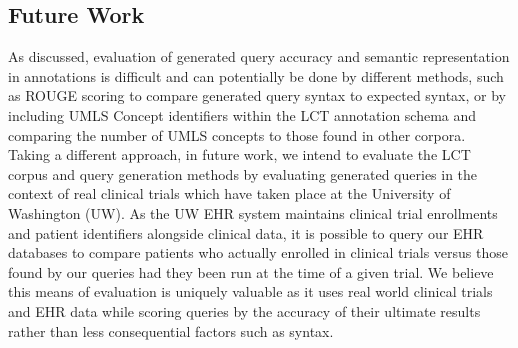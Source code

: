 \documentclass[../main.tex]{subfiles}
\begin{document}
\subsection*{Future Work}
\noindent As discussed, evaluation of generated query accuracy and semantic representation in annotations is difficult and can potentially be done by different methods, such as ROUGE scoring \cite{lin2004rouge} to compare generated query syntax to expected syntax, or by including UMLS Concept identifiers \cite{bodenreider2004unified} within the LCT annotation schema and comparing the number of UMLS concepts to those found in other corpora. \\

\noindent Taking a different approach, in future work, we intend to evaluate the LCT corpus and query generation methods by evaluating generated queries in the context of real clinical trials which have taken place at the University of Washington (UW). As the UW EHR system maintains clinical trial enrollments and patient identifiers alongside clinical data, it is possible to query our EHR databases to compare patients who actually enrolled in clinical trials versus those found by our queries had they been run at the time of a given trial. We believe this means of evaluation is uniquely valuable as it uses real world clinical trials and EHR data while scoring queries by the accuracy of their ultimate results rather than less consequential factors such as syntax.
\end{document}
